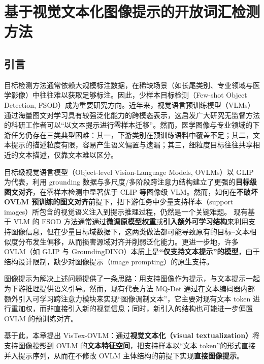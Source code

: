 \chapter{基于视觉文本化图像提示的开放词汇检测方法}

\section{引言}
目标检测方法通常依赖大规模标注数据\cite{redmon2016you,ren2016faster}，在稀缺场景（如长尾类别、专业领域与医学影像）中往往难以获取足够标注。因此，少样本目标检测（Few-shot Object Detection, FSOD）\cite{wang2019metadet,Qiao_2021_defrcn2}成为重要研究方向。近年来，视觉语言预训练模型（VLMs）通过海量图文对学习具有较强泛化能力的跨模态表示，这启发广大研究无监督方法的科研工作者可以“以文本提示进行零样本迁移”。然而，医学图像与专业领域的下游任务仍存在三类典型困难：其一，下游类别在预训练语料中覆盖不足；其二，文本提示的描述粒度有限，容易产生语义偏置与遗漏；其三，细粒度目标往往共享相近的文本描述，仅靠文本难以区分\cite{xu2023mqdet,du2022learning}。

目标级视觉语言模型（Object-level Vision-Language Models, OVLMs）\cite{li2022glip,dou2022fiber,liu2023groundingdino,minderer2022owlvit,ma2022hierkd}以 GLIP\cite{li2022glip} 为代表，利用 grounding 数据与多尺度/多阶段跨注意力结构建立了更强的\textbf{目标级图文对齐}，在零样本检测中显著优于 CLIP\cite{radford2021clip} 等图像级 VLM。然而，如何在\textbf{不破坏 OVLM 预训练的图文对齐}前提下，把下游任务中少量支持样本（support images）所包含的视觉语义注入到提示推理过程，仍然是一个关键难题。
现有基于 VLM 的 FSOD 方法通常通过\textbf{微调原模型权重}或\textbf{引入额外可学习结构}来利用支持图像信息，但在少量目标域数据下，这两类做法都可能导致原有的目标--文本相似度分布发生偏移，从而损害源域对齐并削弱泛化能力。更进一步地，许多 OVLM（如 GLIP 与 GroundingDINO）本质上是\textbf{“仅支持文本提示”的模型}，由于结构设计限制，缺少对图像提示（image prompting）的原生支持\cite{li2022glip,liu2023groundingdino}。

图像提示为解决上述问题提供了一条思路：用支持图像作为提示，与文本提示一起为下游推理提供语义引导\cite{luddecke2022clipseg,xu2023mqdet}。然而，现有代表方法 MQ-Det\cite{xu2023mqdet} 通过在文本编码器内部额外引入可学习跨注意力模块来实现“图像调制文本”，它主要对现有文本 token 进行重加权，而非直接引入新的视觉信息；同时，新引入的结构也可能进一步偏置 OVLM 的预训练对齐。

基于此，本章提出 VisTex-OVLM：通过\textbf{视觉文本化（visual textualization）}将支持图像投影到 OVLM 的\textbf{文本特征空间}，把支持样本以“文本 token”的形式直接并入提示序列，从而在不修改 OVLM 主体结构的前提下实现\textbf{直接图像提示}。

